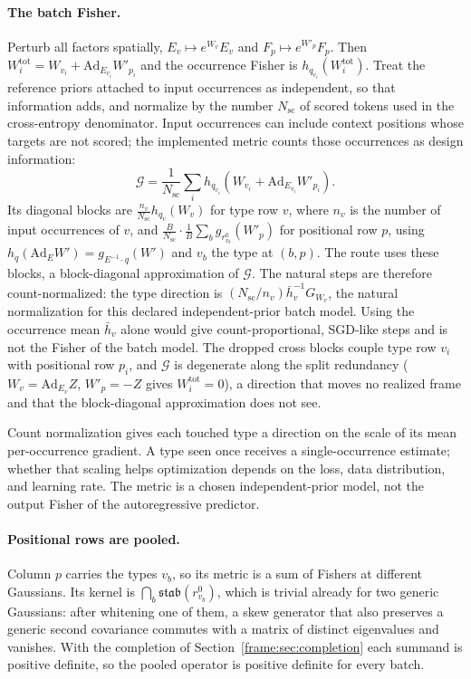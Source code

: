 \documentclass[11pt]{article}
\theoremstyle{definition}
\theoremstyle{remark}
\providecommand{\Ad}{\mathrm{Ad}}
\providecommand{\stab}{\mathfrak{stab}}
\providecommand{\Nsc}{N_{\mathrm{sc}}}
\begin{document}
\paragraph{The batch Fisher.} Perturb all factors spatially, $E_v\mapsto e^{W_v}E_v$ and $F_p\mapsto e^{W'_p}F_p$. Then $W_i^{\mathrm{tot}}=W_{v_i}+\Ad_{E_{v_i}}W'_{p_i}$ and the occurrence Fisher is $h_{q_{v_i}}(W_i^{\mathrm{tot}})$. Treat the reference priors attached to input occurrences as independent, so that information adds, and normalize by the number $\Nsc$ of scored tokens used in the cross-entropy denominator. Input occurrences can include context positions whose targets are not scored; the implemented metric counts those occurrences as design information:
\begin{equation}\label{frame:eq:batch}
\mathcal{G}=\frac{1}{\Nsc}\sum_ih_{q_{v_i}}\left(W_{v_i}+\Ad_{E_{v_i}}W'_{p_i}\right).
\end{equation}
Its diagonal blocks are $\frac{n_v}{\Nsc}h_{q_v}(W_v)$ for type row $v$, where $n_v$ is the number of input occurrences of $v$, and $\frac{B}{\Nsc}\cdot\frac1B\sum_bg_{r^0_{v_b}}(W'_p)$ for positional row $p$, using $h_q(\Ad_EW')=g_{E^{-1}\cdot q}(W')$ and $v_b$ the type at $(b,p)$. The route uses these blocks, a block-diagonal approximation of $\mathcal{G}$. The natural steps are therefore count-normalized: the type direction is $(\Nsc/n_v)\bar h_v^{-1}G_{W_v}$, the natural normalization for this declared independent-prior batch model. Using the occurrence mean $\bar h_v$ alone would give count-proportional, SGD-like steps and is not the Fisher of the batch model. The dropped cross blocks couple type row $v_i$ with positional row $p_i$, and $\mathcal{G}$ is degenerate along the split redundancy ($W_v=\Ad_{E_v}Z$, $W'_p=-Z$ gives $W_i^{\mathrm{tot}}=0$), a direction that moves no realized frame and that the block-diagonal approximation does not see.

Count normalization gives each touched type a direction on the scale of its mean per-occurrence gradient. A type seen once receives a single-occurrence estimate; whether that scaling helps optimization depends on the loss, data distribution, and learning rate. The metric is a chosen independent-prior model, not the output Fisher of the autoregressive predictor.

\paragraph{Positional rows are pooled.} Column $p$ carries the types $v_b$, so its metric is a sum of Fishers at different Gaussians. Its kernel is $\bigcap_b\stab(r^0_{v_b})$, which is trivial already for two generic Gaussians: after whitening one of them, a skew generator that also preserves a generic second covariance commutes with a matrix of distinct eigenvalues and vanishes. With the completion of Section~\ref{frame:sec:completion} each summand is positive definite, so the pooled operator is positive definite for every batch.
\end{document}
